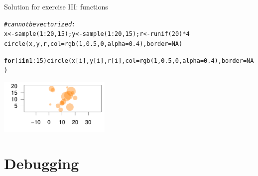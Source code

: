 \documentclass[xcolor=table,      handout ,    xcolor=dvipsnames]{beamer}\usepackage[]{graphicx}\usepackage[]{color}
\makeatletter
\newcommand{\hlnum}[1]{\textcolor[rgb]{0,0,0}{#1}}
\newcommand{\hlcom}[1]{\textcolor[rgb]{0,0.392,0}{\textit{#1}}}
\newcommand{\hlopt}[1]{\textcolor[rgb]{0,0,0}{#1}}
\newcommand{\hlstd}[1]{\textcolor[rgb]{0,0,0}{#1}}
\newcommand{\hlkwa}[1]{\textcolor[rgb]{1,0,0}{\textbf{#1}}}
\newcommand{\hlkwb}[1]{\textcolor[rgb]{0,0,0}{#1}}
\newcommand{\hlkwc}[1]{\textcolor[rgb]{1,0,1}{#1}}
\newcommand{\hlkwd}[1]{\textcolor[rgb]{0,0,1}{#1}}
\newenvironment{kframe}{%
 \def\at@end@of@kframe{}%
 \ifinner\ifhmode%
  \def\at@end@of@kframe{\end{minipage}}%
  \begin{minipage}{\columnwidth}%
 \fi\fi%
 \def\FrameCommand##1{\hskip\@totalleftmargin \hskip-\fboxsep
 \colorbox{shadecolor}{##1}\hskip-\fboxsep
     \hskip-\linewidth \hskip-\@totalleftmargin \hskip\columnwidth}%
 \MakeFramed {\advance\hsize-\width
   \@totalleftmargin\z@ \linewidth\hsize
   \@setminipage}}%
 {\par\unskip\endMakeFramed%
 \at@end@of@kframe}
\newenvironment{knitrout}{}{} %
\newcounter{exercisecount}
\makeatother
\begin{document}

\begin{frame}[fragile]{Solution for exercise  III: functions}
\begin{knitrout}\scriptsize
{}\color{fgcolor}\begin{kframe}
\begin{alltt}
\hlcom{# can not be vectorized:}
\hlstd{x} \hlkwb{<-} \hlkwd{sample}\hlstd{(}\hlnum{1}\hlopt{:}\hlnum{20}\hlstd{,} \hlnum{15}\hlstd{) ;  y} \hlkwb{<-} \hlkwd{sample}\hlstd{(}\hlnum{1}\hlopt{:}\hlnum{20}\hlstd{,} \hlnum{15}\hlstd{) ; r} \hlkwb{<-} \hlkwd{runif}\hlstd{(}\hlnum{20}\hlstd{)}\hlopt{*}\hlnum{4}
\hlkwd{circle}\hlstd{(x,y,r,} \hlkwc{col}\hlstd{=}\hlkwd{rgb}\hlstd{(}\hlnum{1}\hlstd{,}\hlnum{0.5}\hlstd{,}\hlnum{0}\hlstd{,}\hlkwc{alpha}\hlstd{=}\hlnum{0.4}\hlstd{),} \hlkwc{border}\hlstd{=}\hlnum{NA}\hlstd{)}
\end{alltt}


{\ttfamily\noindent\color{warningcolor}{\#\# Warning in circle(x, y, r, col = rgb(1, 0.5, 0, alpha = 0.4), border = NA): Only the first element of the vectors is used.}}\begin{alltt}
\hlkwa{for}\hlstd{(i} \hlkwa{in} \hlnum{1}\hlopt{:}\hlnum{15}\hlstd{)} \hlkwd{circle}\hlstd{(x[i],y[i],r[i],} \hlkwc{col}\hlstd{=}\hlkwd{rgb}\hlstd{(}\hlnum{1}\hlstd{,}\hlnum{0.5}\hlstd{,}\hlnum{0}\hlstd{,}\hlkwc{alpha}\hlstd{=}\hlnum{0.4}\hlstd{),} \hlkwc{border}\hlstd{=}\hlnum{NA}\hlstd{)}
\end{alltt}
\end{kframe}

{\centering \includegraphics[width=0.4\textwidth]{./fig/exfunsolc-1} 

}



\end{knitrout}
\end{frame}


\section{Debugging}
\end{document}
